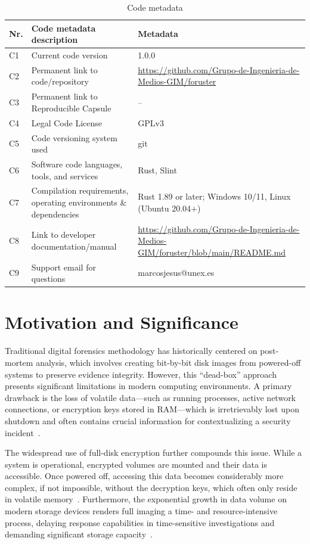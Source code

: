 \documentclass[preprint,12pt,a4paper]{elsarticle}
\begin{document}
\begin{table}[!h]
\scriptsize
\centering
\caption{Code metadata}
\label{tab:metadata}
\begin{tabular}{l|p{5.65cm}|p{7.5cm}}
\hline
\textbf{Nr.} & \textbf{Code metadata description} & \textbf{Metadata} \\
\hline
C1 & Current code version & 1.0.0 \\
\hline
C2 & Permanent link to code/repository & \url{https://github.com/Grupo-de-Ingenieria-de-Medios-GIM/foruster} \\
\hline
C3 & Permanent link to Reproducible Capsule & -- \\
\hline
C4 & Legal Code License & GPLv3 \\
\hline
C5 & Code versioning system used & git \\
\hline
C6 & Software code languages, tools, and services & Rust, Slint \\
\hline
C7 & Compilation requirements, operating environments \& dependencies & Rust 1.89 or later; Windows 10/11, Linux (Ubuntu 20.04+) \\
\hline
C8 & Link to developer documentation/manual & \url{https://github.com/Grupo-de-Ingenieria-de-Medios-GIM/foruster/blob/main/README.md} \\
\hline
C9 & Support email for questions & marcosjesus@unex.es \\
\hline
\end{tabular}
\end{table}
\newpage


\section{Motivation and Significance}

Traditional digital forensics methodology has historically centered on post-mortem analysis, which involves creating bit-by-bit disk images from powered-off systems to preserve evidence integrity. However, this ``dead-box'' approach presents significant limitations in modern computing environments. A primary drawback is the loss of volatile data—such as running processes, active network connections, or encryption keys stored in RAM—which is irretrievably lost upon shutdown and often contains crucial information for contextualizing a security incident~\cite{carrier2003open, adedayo2022review}.

The widespread use of full-disk encryption further compounds this issue. While a system is operational, encrypted volumes are mounted and their data is accessible. Once powered off, accessing this data becomes considerably more complex, if not impossible, without the decryption keys, which often only reside in volatile memory~\cite{casey2011impact}. Furthermore, the exponential growth in data volume on modern storage devices renders full imaging a time- and resource-intensive process, delaying response capabilities in time-sensitive investigations and demanding significant storage capacity~\cite{roussel2016digital, rogers2006computer}.
\end{document}
